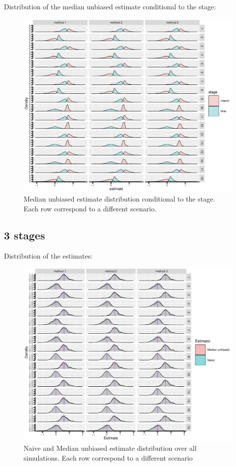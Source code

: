 \documentclass[12pt]{article}
\begin{document}
\clearpage

Distribution of the median unbiased estimate conditional to the stage:
\begin{figure}[!h]
\centering
\includegraphics[trim={0 0 0 0},width=1\textwidth]{./figures/gg2stage-estimateC-density.pdf}
\caption{Median unbiased estimate distribution conditional to the stage. Each row correspond to a different scenario.}
\end{figure}

\clearpage

\subsection{3 stages}
\label{sec:org4165f0e}

Distribution of the estimates:
\begin{figure}[!h]
\centering
\includegraphics[trim={0 0 0 0},width=1\textwidth]{./figures/gg3stage-estimate-density.pdf}
\caption{Naive and Median unbiased estimate distribution over all simulations. Each row correspond to a different scenario}
\end{figure}
\end{document}
